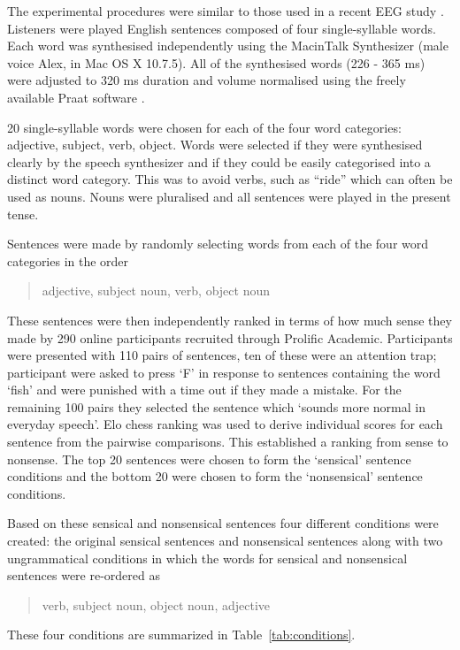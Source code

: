 \documentclass[a4paper,10pt,twoside]{article}
\begin{document}
The experimental procedures were similar to those used in a recent EEG
study \cite{DingEtAl2017}. Listeners were played English sentences
composed of four single-syllable words. Each word was synthesised
independently using the MacinTalk Synthesizer (male voice Alex, in Mac
OS X 10.7.5). All of the synthesised words (226 - 365 ms) were
adjusted to 320 ms duration and volume normalised using the freely
available Praat software \cite{BoersmaWeenink2018}.

20 single-syllable words were chosen for each of the four word
categories: adjective, subject, verb, object. Words were selected if
they were synthesised clearly by the speech synthesizer and if they
could be easily categorised into a distinct word category.  This was
to avoid verbs, such as ``ride'' which can
often be used as nouns. Nouns were pluralised and all sentences were
played in the present tense.

Sentences were made by randomly selecting words from each of the four
word categories in the order 
\begin{quote}
adjective, subject noun, verb, object noun
\end{quote}
These sentences were then independently ranked in terms of how
much sense they made by 290 online participants recruited through
Prolific Academic. Participants were presented with 110 pairs of
sentences, ten of these were an attention trap; participant were asked
to press \lq{F}\rq{} in response to sentences containing the word
\lq{}fish\rq{} and were punished with a time out if they made a
mistake. For the remaining 100 pairs they selected the sentence which
\lq{}sounds more normal in everyday speech\rq{}. Elo
chess ranking \cite{Elo1978} was used to derive individual scores for
each sentence from the pairwise comparisons. This established a
ranking from sense to nonsense. The top 20 sentences were chosen to form the
\lq{}sensical\rq{} sentence conditions and the bottom 20 were chosen to form the \lq{}nonsensical\rq{}
sentence conditions. 

Based on these sensical and nonsensical sentences four different conditions were created: the
original sensical sentences and nonsensical sentences along with two ungrammatical conditions in which the words for sensical and nonsensical sentences were re-ordered as
\begin{quote}
     verb, subject noun, object noun, adjective
\end{quote}
These four conditions are summarized in Table~\ref{tab:conditions}.
\end{document}
